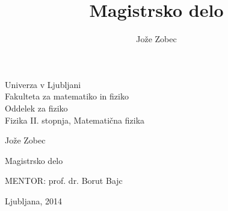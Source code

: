 \documentclass[12pt,a4paper,final,openright,twoside]{report}
\title{Magistrsko delo}
\author{Jože Zobec}
\numberwithin{equation}{chapter}
\numberwithin{table}{chapter}
\begin{document}
\thispagestyle{empty}
\begin{center}
{\Large\sc Univerza v Ljubljani \\
\medskip
Fakulteta za matematiko in fiziko\\
\medskip
Oddelek za fiziko\\
\medskip
Fizika II. stopnja, Matematična fizika}

\vspace{6cm}

{\Large Jože {\sc Zobec}}\\
\bigskip\bigskip\bigskip

{\LARGE {}}

\vspace{0.5cm}
\Large{Magistrsko delo}

\vspace{5cm}

{\Large {\sc MENTOR}: prof. dr. Borut Bajc}

\vfill

{\Large Ljubljana, 2014}
\end{center}

\newpage
\thispagestyle{empty}
\null
\newpage



\tableofcontents





%










\end{document}
